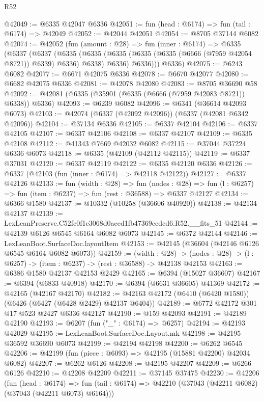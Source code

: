 \begin{lexlean}{R52}
\begin{coremodule}
@42049 := @6335 @42047 @6336
@42051 := fun (head : @6174) => fun (tail : @6174) => @42049
@42052 := @42044 @42051
@42054 := @8705 @37144 @6082
@42074 := @42052
    (fun (amount : @28) =>
    fun (inner : @6174) =>
    @6335
      (@6337
        (@6337
          (@6335
            (@6335 (@6335 (@6335 (@6335 (@6666 (@7959 @42054 @8721)) @6339) @6336) @6338) @6336)
            @6336)))
      @6336)
@42075 := @6243 @6082
@42077 := @6671 @42075 @6336
@42078 := @6670 @42077
@42080 := @6682 @42075 @6336
@42081 := @42078 @42080
@42083 := @8705 @36690 @58
@42092 := @42081 (@6335 (@35901 (@6335 (@6666 (@7959 @42083 @8721)) @6338)) @6336)
@42093 := @6239 @6082
@42096 := @6341 (@36614 @42093 @6073)
@42103 := @42074 (@6337 (@42092 @42096)) (@6337 (@42081 @6342 @42096))
@42104 := @37134 @6336
@42105 := @6337 @42104
@42106 := @6337 @42105
@42107 := @6337 @42106
@42108 := @6337 @42107
@42109 := @6335 @42108
@42112 := @41343 @7669 @42032 @6082
@42115 := @37044 @37224 @6336 @6073
@42118 := @6335 (@42109 (@42112 @42115))
@42119 := @6337 @37031
@42120 := @6337 @42119
@42122 := @6335 @42120 @6336
@42126 := @6337 (@42103 (fun (inner : @6174) => @42118 @42122))
@42127 := @6337 @42126
@42133 := fun (width : @28) =>
  fun (nodes : @28) => fun (l : @6257) => fun (item : @6237) => fun (rest : @36588) => @6337 @42127
@42134 := @6366 @1580
@42137 := @10332 (@10258 (@36606 @40920))
@42138 := @42134 @42137
@42139 := LexLeanPreserve.C52fc0f1c3068d0aced1fb47369ccdcd6.R52.__fits_51
@42144 := @42139 @6126 @6545 @6164 @6082 @6073
@42145 := @6372 @42144
@42146 := LexLeanBoot.SurfaceDoc.layoutItem
@42153 := @42145 (@36604 (@42146 @6126 @6545 @6164 @6082 @6073))
@42159 := (width : @28) ->
  (nodes : @28) -> (l : @6257) -> (item : @6237) -> (rest : @36588) -> @42138 @42153
@42163 := @6386 @1580 @42137 @42153 @2429
@42165 := @6394 (@15027 @36607)
@42167 := @6394 (@6833 @40918)
@42170 := @6394 (@6631 @36605) @41369
@42172 := @42165 (@42167 @42170)
@42182 := @42163 @42172 (@6410 (@6420 @1580)) (@6426 (@6427 (@6428 @2429) @42137 @6404))
@42189 := @6772 @42172 @301 @17 @523 @2427 @6336 @42127
@42190 := @159 @42093
@42191 := @42189 @42190
@42193 := @6207 (fun ("_" : @6174) => @6257)
@42194 := @42193 @42029
@42195 := LexLeanBoot.SurfaceDoc.Layout.mk
@42198 := @42195 @36592 @36690 @6073
@42199 := @42194 @42198
@42200 := @6262 @6545
@42206 := @42199 (fun (piece : @6093) => @42195 (@15881 @42200) @42034 @6082)
@42207 := @6262 @6126
@42208 := @42195 @42207
@42209 := @6266 @6126
@42210 := @42208 @42209
@42211 := @37145 @37475
@42230 := @42206
    (fun (head : @6174) =>
    fun (tail : @6174) => @42210 (@37043 (@42211 @6082) (@37043 (@42211 @6073) @6164)))

\end{coremodule}
\end{lexlean}
